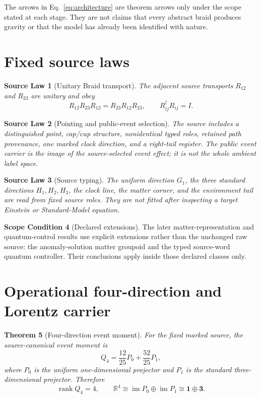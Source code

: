 \documentclass[11pt]{article}
\newtheorem{theorem}{Theorem}[section]
\newtheorem{law}[theorem]{Source Law}
\theoremstyle{definition}
\newtheorem{scope}[theorem]{Scope Condition}
\theoremstyle{remark}
\newcommand{\rank}{\operatorname{rank}}
\begin{document}
The arrows in Eq.~\eqref{eq:architecture} are theorem arrows only under the scope stated at each stage. They are not claims that every abstract braid produces gravity or that the model has already been identified with nature.

\section{Fixed source laws}

\begin{law}[Unitary Braid transport]
The adjacent source transports $R_{12}$ and $R_{23}$ are unitary and obey
\begin{equation}
R_{12}R_{23}R_{12}=R_{23}R_{12}R_{23},
\qquad R_{ij}^{\dagger}R_{ij}=I.
\label{eq:ybe}
\end{equation}
\end{law}

\begin{law}[Pointing and public-event selection]
The source includes a distinguished point, cap/cup structure, nonidentical typed roles, retained path provenance, one marked clock direction, and a right-tail register. The public event carrier is the image of the source-selected event effect; it is not the whole ambient label space.
\end{law}

\begin{law}[Source typing]
The uniform direction $G_1$, the three standard directions $H_1,H_2,H_3$, the clock line, the matter corner, and the environment tail are read from fixed source roles. They are not fitted after inspecting a target Einstein or Standard-Model equation.
\end{law}

\begin{scope}[Declared extensions]
The later matter-representation and quantum-control results use explicit extensions rather than the unchanged raw source: the anomaly-solution matter groupoid and the typed source-word quantum controller. Their conclusions apply inside those declared classes only.
\end{scope}

\section{Operational four-direction and Lorentz carrier}

\begin{theorem}[Four-direction event moment]
For the fixed marked source, the source-canonical event moment is
\begin{equation}
Q_4=\frac{12}{25}P_0+\frac{52}{25}P_1,
\label{eq:q4}
\end{equation}
where $P_0$ is the uniform one-dimensional projector and $P_1$ is the standard three-dimensional projector. Therefore
\begin{equation}
\rank Q_4=4,
\qquad
\mathbb R^4\cong\operatorname{im}P_0\oplus\operatorname{im}P_1
\cong \mathbf 1\oplus\mathbf 3.
\end{equation}
\end{theorem}
\end{document}
